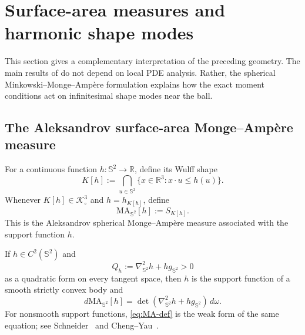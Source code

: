 \documentclass[11pt]{article}
\theoremstyle{definition}
\theoremstyle{remark}
\newcommand{\Sph}{\mathbb S}
\newcommand{\R}{\mathbb R}
\newcommand{\K}{\mathcal K}
\newcommand{\MA}{\mathrm{MA}}
\begin{document}
\section{Surface-area measures and harmonic shape modes}\label{sec:modes}

This section gives a complementary interpretation of the preceding geometry. The main results of  do not depend on local PDE analysis. Rather, the spherical Minkowski--Monge--Amp\`ere formulation explains how the exact moment conditions act on infinitesimal shape modes near the ball.

\subsection{The Aleksandrov surface-area Monge--Amp\`ere measure}
For a continuous function $h:\Sph^2\to\R$, define its Wulff shape
\begin{equation}\label{eq:wulff}
K[h]:=\bigcap_{u\in\Sph^2}\{x\in\R^3:x\cdot u\le h(u)\}.
\end{equation}
Whenever $K[h]\in\K^3_\circ$ and $h=h_{K[h]}$, define
\begin{equation}\label{eq:MA-def}
\MA_{\Sph^2}[h]:=S_{K[h]}.
\end{equation}
This is the Aleksandrov spherical Monge--Amp\`ere measure associated with the support function $h$.

If $h\in C^2(\Sph^2)$ and
\begin{equation}\label{eq:Qh}
Q_h:=\nabla^2_{\Sph^2}h+h g_{\Sph^2}>0
\end{equation}
as a quadratic form on every tangent space, then $h$ is the support function of a smooth strictly convex body and
\begin{equation}\label{eq:smooth-MA}
d\MA_{\Sph^2}[h]
=\det(\nabla^2_{\Sph^2}h+h g_{\Sph^2})\,d\omega.
\end{equation}
For nonsmooth support functions, \eqref{eq:MA-def} is the weak form of the same equation; see Schneider~\cite[Chapter~8]{Schneider2014} and Cheng--Yau~\cite{ChengYau1976}.
\end{document}
